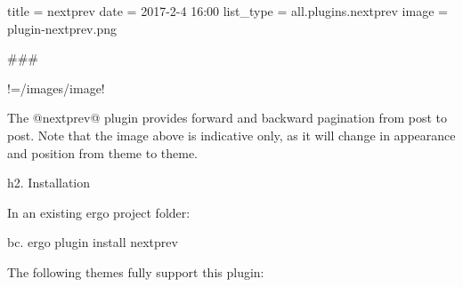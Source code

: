title = nextprev
date = 2017-2-4 16:00
list_type = all.plugins.nextprev
image = plugin-nextprev.png

###

!=/images/{{image}}!

The @nextprev@ plugin provides forward and backward pagination from post to post. Note that the image above is indicative only, as it will change in appearance and position from theme to theme.


h2. Installation

In an existing ergo project folder:

bc.
ergo plugin install nextprev


The following themes fully support this plugin:



